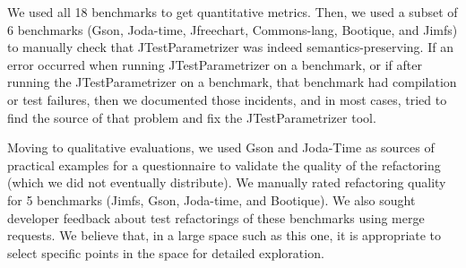We used all 18 benchmarks to get quantitative metrics. Then, we used a subset of 6 benchmarks (Gson, Joda-time, Jfreechart, Commons-lang, Bootique, and Jimfs) to manually check that JTestParametrizer was indeed semantics-preserving. If an error occurred when running JTestParametrizer on a benchmark, or if after running the JTestParametrizer on a benchmark, that benchmark had compilation or test failures, then we documented those incidents, and in most cases, tried to find the source of that problem and fix the JTestParametrizer tool.

Moving to qualitative evaluations, we used Gson and Joda-Time as sources of practical examples for a questionnaire to validate the quality of the refactoring (which we did not eventually distribute).
We manually rated refactoring quality for 5 benchmarks (Jimfs, Gson, Joda-time, and Bootique). We also sought developer feedback about test refactorings of these benchmarks using merge requests.
We believe that, in a large space such as this one, it is appropriate to select specific points in the space for detailed exploration.
